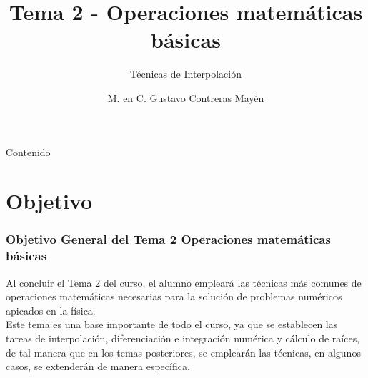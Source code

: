
\usepackage{epstopdf}

\title{Tema 2 - Operaciones matemáticas básicas}
\subtitle{Técnicas de Interpolación}
\author{M. en C. Gustavo Contreras Mayén}

\maketitle
\fontsize{14}{14}\selectfont
{}
\begin{frame}{Contenido}
\tableofcontents[pausesections]
\end{frame}
\section{Objetivo}
\begin{frame}
\frametitle{Objetivo General del Tema 2 Operaciones matemáticas básicas}
Al concluir el Tema 2 del curso, el alumno empleará las técnicas más comunes de operaciones matemáticas necesarias para la solución de problemas numéricos apicados en la física.
\\
\medskip
Este tema es una base importante de todo el curso, ya que se establecen las tareas de interpolación, diferenciación e integración numérica y cálculo de raíces, de tal manera que en los temas posteriores, se emplearán las técnicas, en algunos casos, se extenderán de manera específica.
\end{frame}
